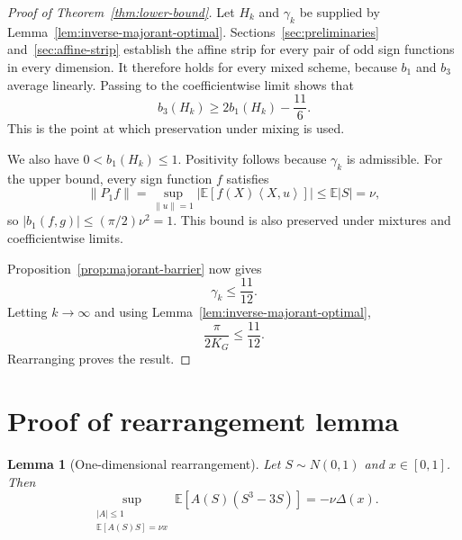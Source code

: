 \documentclass[11pt]{article}
\newtheorem{lemma}[theorem]{Lemma}
\numberwithin{equation}{section}
\newcommand{\E}{\mathbb E}
\newcommand{\ip}[2]{\left\langle #1,#2\right\rangle}
\newcommand{\norm}[1]{\left\|#1\right\|}
\begin{document}
\begin{proof}[Proof of Theorem~\ref{thm:lower-bound}]
Let $H_k$ and $\gamma_k$ be supplied by Lemma~\ref{lem:inverse-majorant-optimal}. Sections~\ref{sec:preliminaries} and~\ref{sec:affine-strip} establish the affine strip for every pair of odd sign functions in every dimension. It therefore holds for every mixed scheme, because $b_1$ and $b_3$ average linearly. Passing to the coefficientwise limit shows that
\[
        b_3(H_k)\ge2b_1(H_k)-\frac{11}{6}.
\]
This is the point at which preservation under mixing is used.

We also have $0<b_1(H_k)\le1$. Positivity follows because $\gamma_k$ is admissible. For the upper bound, every sign function $f$ satisfies
\[
        \norm{P_1f}
        =\sup_{\norm{u}=1}\left|\E[f(X)\ip{X}{u}]\right|
        \le\E|S|=\nu,
\]
so $|b_1(f,g)|\le(\pi/2)\nu^2=1$. This bound is also preserved under mixtures and coefficientwise limits.

Proposition~\ref{prop:majorant-barrier} now gives
\[
        \gamma_k\le\frac{11}{12}.
\]
Letting $k\to\infty$ and using Lemma~\ref{lem:inverse-majorant-optimal},
\[
        \frac{\pi}{2K_G}\le\frac{11}{12}.
\]
Rearranging proves the result.
\end{proof}

\appendix

\section{Proof of rearrangement lemma}
\label{app:rearrangement_lemma}

\begin{lemma}[One-dimensional rearrangement]
Let $S\sim N(0,1)$ and $x\in[0,1]$. Then
\[
        \sup_{\substack{|A|\le1\\ \E[A(S)S]=\nu x}}
        \E[A(S)(S^3-3S)]
        =-\nu\Delta(x).
\]
\end{lemma}
\end{document}
